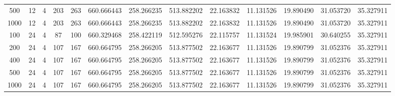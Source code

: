 \begin{table}[h]
\begin{tabular}{ccccccccccccc}
500 & 12 & 4 & 203 & 263 & 660.666443 & 258.266235 & 513.882202 & 22.163832 & 11.131526 & 19.890490 & 31.053720 & 35.327911 \\
1000 & 12 & 4 & 203 & 263 & 660.666443 & 258.266235 & 513.882202 & 22.163832 & 11.131526 & 19.890490 & 31.053720 & 35.327911 \\
100 & 24 & 4 & 87 & 100 & 660.329468 & 258.422119 & 512.595276 & 22.115757 & 11.131524 & 19.985901 & 30.640255 & 35.327911 \\
200 & 24 & 4 & 107 & 167 & 660.664795 & 258.266205 & 513.877502 & 22.163677 & 11.131526 & 19.890799 & 31.052376 & 35.327911 \\
400 & 24 & 4 & 107 & 167 & 660.664795 & 258.266205 & 513.877502 & 22.163677 & 11.131526 & 19.890799 & 31.052376 & 35.327911 \\
500 & 24 & 4 & 107 & 167 & 660.664795 & 258.266205 & 513.877502 & 22.163677 & 11.131526 & 19.890799 & 31.052376 & 35.327911 \\
1000 & 24 & 4 & 107 & 167 & 660.664795 & 258.266205 & 513.877502 & 22.163677 & 11.131526 & 19.890799 & 31.052376 & 35.327911 \\
\bottomrule
\end{tabular}
\end{table}

